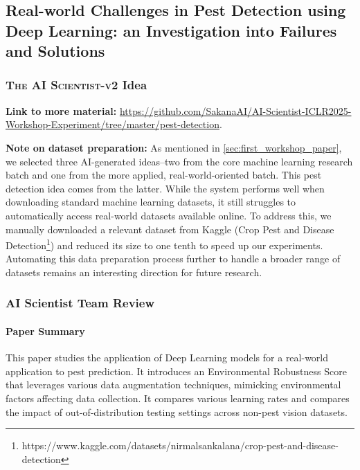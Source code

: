 \documentclass[11pt, a4paper]{include/gdm_format}
\newcommand{\ouralgo}{\textsc{The AI Scientist-v2}\xspace}
\begin{document}
\clearpage

\subsection{Real-world Challenges in Pest Detection using Deep Learning: an Investigation into Failures and Solutions}

\subsubsection{\ouralgo Idea}
\begin{tcolorbox}[colback=blue!5!white, colframe=blue!75!black, title=Idea]
{\scriptsize  }
\end{tcolorbox}

\textbf{Link to more material:} \url{https://github.com/SakanaAI/AI-Scientist-ICLR2025-Workshop-Experiment/tree/master/pest-detection}.

\textbf{Note on dataset preparation:}
As mentioned in \cref{sec:first_workshop_paper}, we selected three AI-generated ideas--two from the core machine learning research batch and one from the more applied, real-world-oriented batch. This pest detection idea comes from the latter.
While the system performs well when downloading standard machine learning datasets, it still struggles to automatically access real-world datasets available online. To address this, we manually downloaded a relevant dataset from Kaggle (Crop Pest and Disease Detection\footnote{https://www.kaggle.com/datasets/nirmalsankalana/crop-pest-and-disease-detection}) and reduced its size to one tenth to speed up our experiments.
Automating this data preparation process further to handle a broader range of datasets remains an interesting direction for future research.



\label{paper:pest_detection}

%
\subsubsection{AI Scientist Team Review}

\paragraph{Paper Summary}
This paper studies the application of Deep Learning models for a real-world application to pest prediction. It introduces an Environmental Robustness Score that leverages various data augmentation techniques, mimicking environmental factors affecting data collection. It compares various learning rates and compares the impact of out-of-distribution testing settings across non-pest vision datasets.
\end{document}
